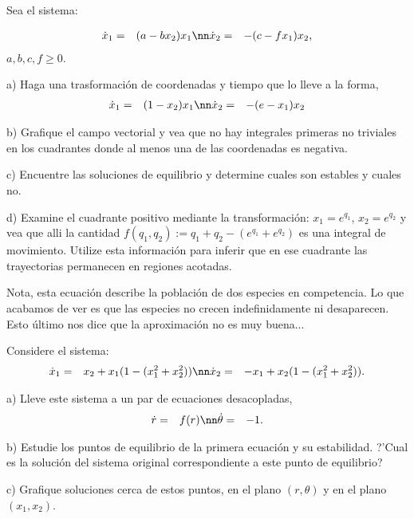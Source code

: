 
Sea el sistema:

\begin{eqnarray}
  \label{eq:Volterra_Lotka}
  \dot{x}_1 &=& (a-bx_2)x_1 \nn
  \dot{x}_2 &=& -(c-f x_1)x_2,
\end{eqnarray}
$a, b, c, f \geq 0$.

a) Haga una trasformaci\'on de coordenadas y tiempo que lo lleve a la forma,
\begin{eqnarray}
  \label{eq:Volterra_Lotka_adim}
  \dot{x}_1 &=& (1 - x_2)x_1 \nn
  \dot{x}_2 &=& -(e - x_1)x_2
\end{eqnarray}
%

b) Grafique el campo vectorial y vea que no hay integrales primeras no
triviales en los cuadrantes donde al menos una de las coordenadas es
negativa.

c) Encuentre las soluciones de equilibrio y determine cuales son 
estables y cuales no.

d) Examine el cuadrante positivo mediante la transformaci\'on:
$x_1 = e^{q_1}$, $x_2 = e^{q_2}$ y vea que alli la cantidad
$f(q_1,q_2) := q_1 + q_2 -(e^{q_1} + e^{q_2})$ es una integral
de movimiento. Utilize esta informaci\'on para inferir que en ese
cuadrante las trayectorias permanecen en regiones acotadas.

Nota, esta ecuaci\'on describe la poblaci\'on de dos especies en competencia.
Lo que acabamos de ver es que las especies no crecen indefinidamente ni
desaparecen. Esto \'ultimo nos dice que la aproximaci\'on no es
muy buena...
\epro

Considere el sistema:
\begin{eqnarray}
  \label{eq:Ciclo_Limite_Prob}
  \dot{x}_1 &=& x_2 + x_1(1-(x_1^2+x_2^2)) \nn
  \dot{x}_2 &=& -x_1 + x_2(1-(x_1^2+x_2^2)).
\end{eqnarray}
%

a) Lleve este sistema a un par de ecuaciones desacopladas,
\begin{eqnarray}
  \label{eq:Ciclo_Limite_Prob_des}
  \dot{r} &=&  f(r) \nn
  \dot{\theta} &=& -1.
\end{eqnarray}
%

b) Estudie los puntos de equilibrio de la primera ecuaci\'on y su estabilidad.
?'Cual es la soluci\'on del sistema original correspondiente a este punto
de equilibrio?


c) Grafique soluciones cerca de estos puntos, en el plano $(r,\theta)$ y en el
plano $(x_1,x_2)$.






